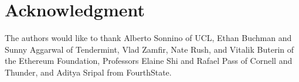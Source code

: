 \documentclass[10pt,journal,compsoc]{IEEEtran}
\begin{document}
  \section*{Acknowledgment}
\fi
The authors would like to thank Alberto Sonnino of UCL, Ethan Buchman and Sunny Aggarwal of Tendermint, Vlad Zamfir, Nate Rush, and Vitalik Buterin of the Ethereum Foundation, Professors Elaine Shi and Rafael Pass of Cornell and Thunder, and Aditya Sripal from FourthState.

\ifCLASSOPTIONcaptionsoff
  \newpage
\fi




\end{document}
